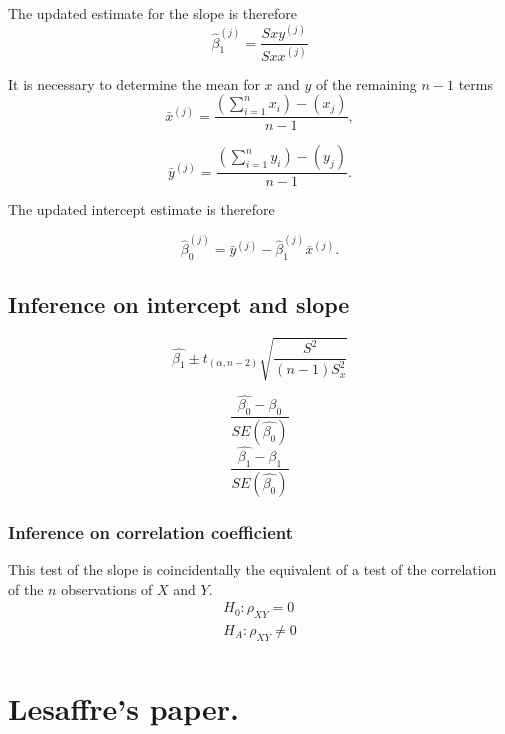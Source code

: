 \documentclass[12pt, a4paper]{report}
\theoremstyle{plain}
\theoremstyle{definition}
\theoremstyle{remark}
\begin{document}
The updated estimate for the slope is therefore
\begin{equation}
\hat{\beta}_{1}^{(j)}=\frac{Sxy^{(j)}}{Sxx^{(j)}}
\end{equation}

It is necessary to determine the mean for $x$ and $y$ of the
remaining $n-1$ terms
\begin{equation}
\bar{x}^{(j)}=\frac{(\sum_{i=1}^{n}x_{i})-(x_{j})}{n-1},
\end{equation}

\begin{equation}
\bar{y}^{(j)}=\frac{(\sum_{i=1}^{n}y_{i})-(y_{j})}{n-1}.
\end{equation}

The updated intercept estimate is therefore

\begin{equation}
\hat{\beta}_{0}^{(j)}=\bar{y}^{(j)}-\hat{\beta}_{1}^{(j)}\bar{x}^{(j)}.
\end{equation}

\subsection{Inference on intercept and slope}
\begin{equation}
\hat{\beta_{1}} \pm t_{(\alpha, n-2) }
\sqrt{\frac{S^2}{(n-1)S^{2}_{x}}}
\end{equation}

\begin{equation}
\frac{\hat{\beta_{0}}-\beta_{0}}{SE(\hat{\beta_{0}})}
\end{equation}
\begin{equation}
\frac{\hat{\beta_{1}}-\beta_{1}}{SE(\hat{\beta_{0}})}
\end{equation}


\subsubsection{Inference on correlation coefficient} This test of
the slope is coincidentally the equivalent of a test of the
correlation of the $n$ observations of $X$ and $Y$.
\begin{eqnarray}
H_{0}: \rho_{XY} = 0 \nonumber \\
H_{A}: \rho_{XY} \ne 0 \nonumber \\
\end{eqnarray}

\newpage
\section{Lesaffre's paper.} %
\end{document}
